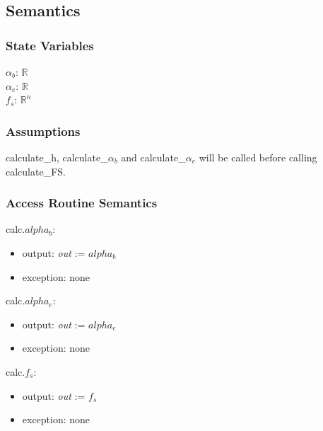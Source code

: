 \documentclass[12pt, titlepage]{article}
\begin{document}
\subsection{Semantics}

\subsubsection{State Variables}

$\alpha_b$: $\mathbb{R}$ \\ 
$\alpha_e$: $\mathbb{R}$\\
$f_s$: $\mathbb{R}^n$\\

\subsubsection{Assumptions}

calculate\_h, calculate\_$\alpha_b$ and calculate\_$\alpha_e$  will be called before calling calculate\_FS.

\subsubsection{Access Routine Semantics}

\noindent calc.$alpha_b$:
\begin{itemize}
\item output: \textit{out} := $alpha_b$
\item exception: none
\end{itemize}

\noindent calc.$alpha_e$:
\begin{itemize}
\item output: \textit{out} := $alpha_e$
\item exception: none
\end{itemize}

\noindent calc.$f_s$:
\begin{itemize}
\item output: \textit{out} := $f_s$
\item exception: none
\end{itemize}
\end{document}
